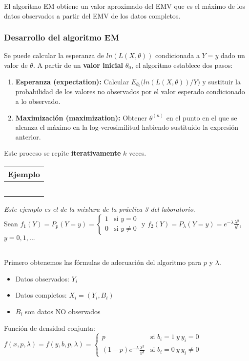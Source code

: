 El algoritmo EM obtiene un valor aproximado del EMV que es el máximo de los datos observados a partir del EMV de los datos completos.

\subsubsection*{Desarrollo del algoritmo EM}
Se puede calcular la esperanza de $ln(L(X,\theta))$ condicionada a $Y=y$ dado un valor de $\theta$. A partir de un \textbf{valor inicial} $\theta_0$, el algoritmo establece dos pasos:
\begin{enumerate}
    \item \textbf{Esperanza (expectation):} Calcular $E_{\theta_0}\Big(ln(L(X,\theta))\big/Y\Big)$ y sustituir la probabilidad de los valores no observados por el valor esperado condicionado a lo observado.
    \item \textbf{Maximización (maximization):} Obtener $\theta^{(n)}$ en el punto en el que se alcanza el máximo en la log-verosimilitud habiendo sustituido la expresión anterior.
\end{enumerate} 
Este proceso se repite \textbf{iterativamente} $k$ veces. 

\pagebreak

\hspace{-1cm}\noindent\begin{tabular}{r}
    \textbf{Ejemplo}  \\ \hline \ \\
\end{tabular}

\textit{Este ejemplo es el de la mixtura de la práctica 3 del laboratorio}.\\
Sean $f_1(Y)=P_p(Y=y)=\begin{cases}
    1 & \text{si } y=0 \\
    0 & \text{si } y \neq 0
\end{cases}$ y $f_2(Y)=P_\lambda(Y=y)=e^{-\lambda}\frac{\lambda^y}{y!}$, $y=0,1,...$

\ \\
Primero obtenemos las fórmulas de adecuación del algoritmo para $p$ y $\lambda$.
\begin{itemize}
    \item Datos observados: $Y_i$
    \item Datos completos: $X_i=(Y_i,B_i)$
    \item $B_i$ son datos NO observados
\end{itemize}
Función de densidad conjunta: $ f(x,p,\lambda)=f(y,b,p,\lambda)=\begin{cases}
    p & \text{si } b_i=1\ y\ y_i=0 \\
    (1-p)e^{-\lambda}\frac{\lambda^y}{y!} & \text{si } b_i=0\ y\ y_i \neq 0
\end{cases} $

